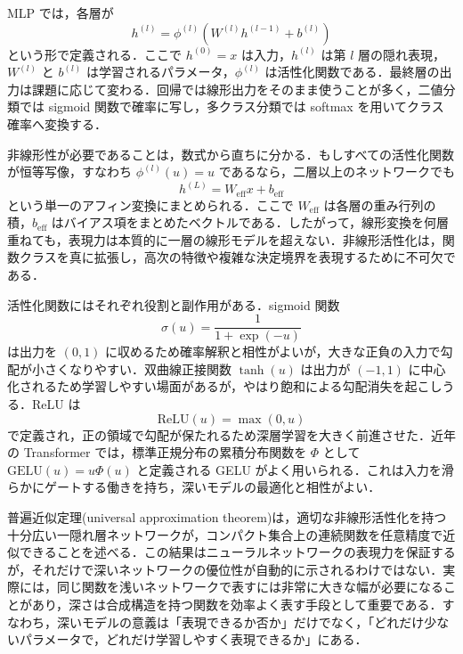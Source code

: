 MLP では，各層が
\begin{equation}
h^{(l)} = \phi^{(l)}(W^{(l)}h^{(l-1)} + b^{(l)})
\end{equation}
という形で定義される．ここで $h^{(0)}=x$ は入力，$h^{(l)}$ は第 $l$ 層の隠れ表現，$W^{(l)}$ と $b^{(l)}$ は学習されるパラメータ，$\phi^{(l)}$ は活性化関数である．最終層の出力は課題に応じて変わる．回帰では線形出力をそのまま使うことが多く，二値分類では sigmoid 関数で確率に写し，多クラス分類では softmax を用いてクラス確率へ変換する．

非線形性が必要であることは，数式から直ちに分かる．もしすべての活性化関数が恒等写像，すなわち $\phi^{(l)}(u)=u$ であるなら，二層以上のネットワークでも
\begin{equation}
h^{(L)} = W_{\mathrm{eff}}x + b_{\mathrm{eff}}
\end{equation}
という単一のアフィン変換にまとめられる．ここで $W_{\mathrm{eff}}$ は各層の重み行列の積，$b_{\mathrm{eff}}$ はバイアス項をまとめたベクトルである．したがって，線形変換を何層重ねても，表現力は本質的に一層の線形モデルを超えない．非線形活性化は，関数クラスを真に拡張し，高次の特徴や複雑な決定境界を表現するために不可欠である．

活性化関数にはそれぞれ役割と副作用がある．sigmoid 関数
\begin{equation}
\sigma(u)=\frac{1}{1+\exp(-u)}
\end{equation}
は出力を $(0,1)$ に収めるため確率解釈と相性がよいが，大きな正負の入力で勾配が小さくなりやすい．双曲線正接関数 $\tanh(u)$ は出力が $(-1,1)$ に中心化されるため学習しやすい場面があるが，やはり飽和による勾配消失を起こしうる．ReLU は
\begin{equation}
\mathrm{ReLU}(u)=\max(0,u)
\end{equation}
で定義され，正の領域で勾配が保たれるため深層学習を大きく前進させた．近年の Transformer では，標準正規分布の累積分布関数を $\Phi$ として $\mathrm{GELU}(u)=u\Phi(u)$ と定義される GELU がよく用いられる．これは入力を滑らかにゲートする働きを持ち，深いモデルの最適化と相性がよい．

普遍近似定理(universal approximation theorem)は，適切な非線形活性化を持つ十分広い一隠れ層ネットワークが，コンパクト集合上の連続関数を任意精度で近似できることを述べる．この結果はニューラルネットワークの表現力を保証するが，それだけで深いネットワークの優位性が自動的に示されるわけではない．実際には，同じ関数を浅いネットワークで表すには非常に大きな幅が必要になることがあり，深さは合成構造を持つ関数を効率よく表す手段として重要である．すなわち，深いモデルの意義は「表現できるか否か」だけでなく，「どれだけ少ないパラメータで，どれだけ学習しやすく表現できるか」にある．

